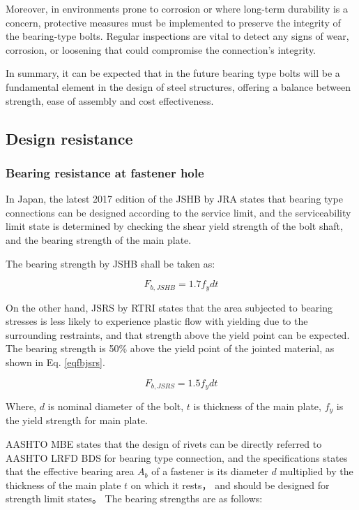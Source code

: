 Moreover, in environments prone to corrosion or where long-term durability is a concern, protective measures must be implemented to preserve the integrity of the bearing-type bolts. Regular inspections are vital to detect any signs of wear, corrosion, or loosening that could compromise the connection's integrity.

In summary, it can be expected that in the future bearing type bolts will be a fundamental element in the design of steel structures, offering a balance between strength, ease of assembly and cost effectiveness.

\subsection{Design resistance}

\subsubsection{Bearing resistance at fastener hole}

In Japan, the latest 2017 edition of the \ac{JSHB} by \ac{JRA} \cite{douji2017} states that bearing type connections can be designed according to the service limit, and the serviceability limit state is determined by checking the shear yield strength of the bolt shaft, and the bearing strength of the main plate.

The bearing strength by JSHB shall be taken as:

\begin{equation}
    F_{b,JSHB} = 1.7 f_y dt
\end{equation}

On the other hand, \ac{JSRS} by \ac{RTRI} \cite{rtri2009Design} states that the area subjected to bearing stresses is less likely to experience plastic flow with yielding due to the surrounding restraints, and that strength above the yield point can be expected. The bearing strength is 50\% above the yield point of the jointed material, as shown in Eq. \ref{eqfbjsrs}.

\begin{equation}\label{eqfbjsrs}
    F_{b,JSRS} = 1.5 f_y dt
\end{equation}


Where, $d$ is nominal diameter of the bolt, $t$ is thickness of the main plate, $f_y$ is the yield strength for main plate.

AASHTO MBE \cite{aashtombe2018Manual} states that the design of rivets can be directly referred to \ac{AASHTO} \ac{LRFD} BDS for bearing type connection, and the specifications states that the effective bearing area $A_{b}$ of a fastener is its diameter $d$ multiplied by the thickness of the main plate $t$ on which it rests， and should be designed for strength limit states。 The bearing strengths are as follows:

